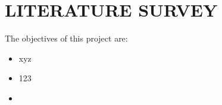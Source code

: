 \chapter{LITERATURE SURVEY}
	\label{chap:LR}
	
	The objectives of this project are:
	\begin{itemize}
		\item xyz
		\item 123
		\item
	\end{itemize}